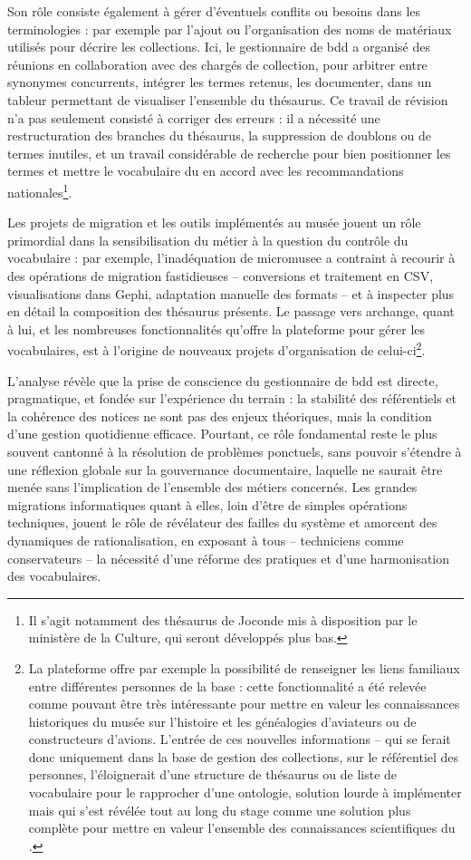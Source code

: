 Son rôle consiste également à gérer d'éventuels conflits ou besoins dans les terminologies : par exemple par l'ajout ou l'organisation des noms de matériaux utilisés pour décrire les collections. Ici, le gestionnaire de \ac{bdd} a organisé des réunions en collaboration avec des chargés de collection, pour arbitrer entre synonymes concurrents, intégrer les termes retenus, les documenter, dans un tableur permettant de visualiser l'ensemble du thésaurus. Ce travail de révision n’a pas seulement consisté à corriger des erreurs : il a nécessité une restructuration des branches du thésaurus, la suppression de doublons ou de termes inutiles, et un travail considérable de recherche pour bien positionner les termes et mettre le vocabulaire du \mae en accord avec les recommandations nationales\footnote{Il s'agit notamment des thésaurus de Joconde mis à disposition par le ministère de la Culture, qui seront développés plus bas.}.

Les projets de migration et les outils implémentés au musée jouent un rôle primordial dans la sensibilisation du métier à la question du contrôle du vocabulaire : par exemple, l’inadéquation de \gls{micromusee} a contraint à recourir à des opérations de migration fastidieuses -- conversions et traitement en CSV, visualisations dans Gephi, adaptation manuelle des formats -- et à inspecter plus en détail la composition des thésaurus présents. Le passage vers \gls{archange}, quant à lui, et les nombreuses fonctionnalités qu'offre la plateforme pour gérer les vocabulaires, est à l'origine de nouveaux projets d'organisation de celui-ci\footnote{La plateforme offre par exemple la possibilité de renseigner les liens familiaux entre différentes personnes de la base : cette fonctionnalité a été relevée comme pouvant être très intéressante pour mettre en valeur les connaissances historiques du musée sur l'histoire et les généalogies d'aviateurs ou de constructeurs d'avions. L'entrée de ces nouvelles informations -- qui se ferait donc uniquement dans la base de gestion des collections, sur le référentiel des personnes, l'éloignerait d'une structure de thésaurus ou de liste de vocabulaire pour le rapprocher d'une ontologie, solution lourde à implémenter mais qui s'est révélée tout au long du stage comme une solution plus complète pour mettre en valeur l'ensemble des connaissances scientifiques du \mae.}.

L’analyse révèle que la prise de conscience du gestionnaire de \ac{bdd} est directe, pragmatique, et fondée sur l’expérience du terrain : la stabilité des référentiels et la cohérence des notices ne sont pas des enjeux théoriques, mais la condition d’une gestion quotidienne efficace. Pourtant, ce rôle fondamental reste le plus souvent cantonné à la résolution de problèmes ponctuels, sans pouvoir s’étendre à une réflexion globale sur la gouvernance documentaire, laquelle ne saurait être menée sans l’implication de l’ensemble des métiers concernés. Les grandes migrations informatiques quant à elles, loin d’être de simples opérations techniques, jouent le rôle de révélateur des failles du système et amorcent des dynamiques de rationalisation, en exposant à tous -- techniciens comme conservateurs -- la nécessité d’une réforme des pratiques et d’une harmonisation des vocabulaires.

